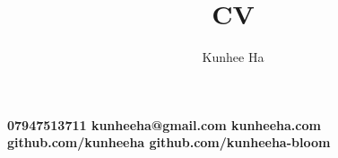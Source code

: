 \documentclass{article}
\renewcommand{\maketitle}{
  {\noindent\rmfamily\Huge\bfseries\MakeUppercase\theauthor}
  \vspace{.8em}
  }
\newcommand{\contacts}[5]{
  {\noindent\rmfamily\small\color{BodyGrey}\bfseries
    {\color{LightGrey}\faPhone}\hspace{5pt}#1\hspace{12pt}      %
    {\color{LightGrey}\faEnvelope}\hspace{5pt}#2\hspace{12pt}   %
    {\color{LightGrey}\faLink}\hspace{5pt}#3\hspace{12pt}       %
    {\color{LightGrey}\faGithub}\hspace{5pt}#4\hspace{12pt}     %
    {\color{LightGrey}\faGithub}\hspace{5pt}#5                  %
  }
}
\begin{document}

  \title{CV}
  \author{Kunhee Ha}

  \maketitle

\contacts
  {07947513711}
  {kunheeha@gmail.com}
  {kunheeha.com}
  {github.com/kunheeha}
  {github.com/kunheeha-bloom}

\color{BodyGrey}
\end{document}
